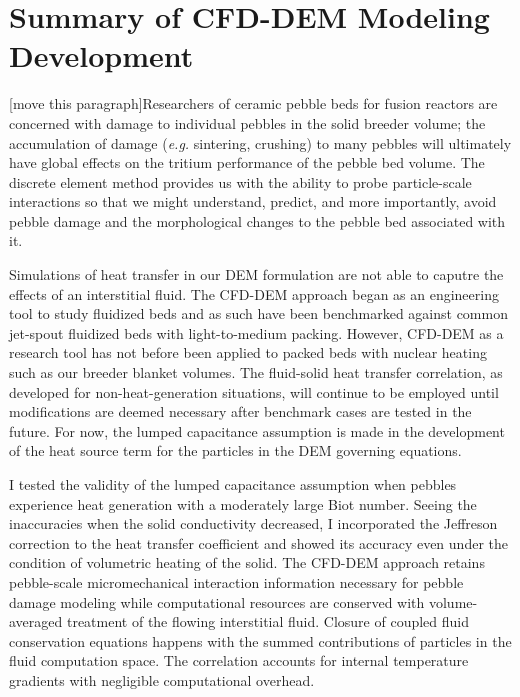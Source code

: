 %
%
\section{Summary of CFD-DEM Modeling Development}

[move this paragraph]Researchers of ceramic pebble beds for fusion reactors are concerned with damage to individual pebbles in the solid breeder volume; the accumulation of damage (\textit{e.g.} sintering, crushing) to many pebbles will ultimately have global effects on the tritium performance of the pebble bed volume.  The discrete element method provides us with the ability to probe particle-scale interactions so that we might understand, predict, and more importantly, avoid pebble damage and the morphological changes to the pebble bed associated with it. 

Simulations of heat transfer in our DEM formulation are not able to caputre the effects of an interstitial fluid. The CFD-DEM approach began as an engineering tool to study fluidized beds and as such have been benchmarked against common jet-spout fluidized beds with light-to-medium packing. However, CFD-DEM as a research tool has not before been applied to packed beds with nuclear heating such as our breeder blanket volumes. The fluid-solid heat transfer correlation, as developed for non-heat-generation situations, will continue to be employed until modifications are deemed necessary after benchmark cases are tested in the future. For now, the lumped capacitance assumption is made in the development of the heat source term for the particles in the DEM governing equations.

I tested the validity of the lumped capacitance assumption when pebbles experience heat generation with a moderately large Biot number. Seeing the inaccuracies when the solid conductivity decreased, I incorporated the Jeffreson correction to the heat transfer coefficient and showed its accuracy even under the condition of volumetric heating of the solid. The CFD-DEM approach retains pebble-scale micromechanical interaction information necessary for pebble damage modeling while computational resources are conserved with volume-averaged treatment of the flowing interstitial fluid. Closure of coupled fluid conservation equations happens with the summed contributions of particles in the fluid computation space. The correlation accounts for internal temperature gradients with negligible computational overhead.


